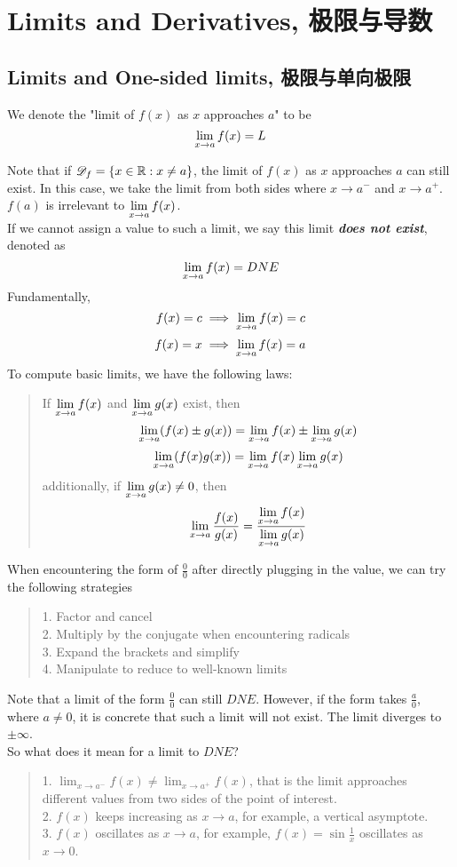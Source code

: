 \section{Limits and Derivatives, 极限与导数}
\subsection{Limits and One-sided limits, 极限与单向极限}
\begin{definition}
    We denote the "limit of $f(x)$ as $x$ approaches $a$" to be
    $$\lim_{x \to a} f(x) = L$$
\end{definition}
Note that if $\mathscr{D}_f = \{x \in \mathbb{R}: x \ne a\}$, the limit of $f(x)$ as $x$ approaches $a$ can still exist. In this case, we take the limit from both sides where $x \to a^-$ and $x \to a^+$. \\
$f(a)$ is irrelevant to $\displaystyle \lim_{x \to a} f(x)$. \\
If we cannot assign a value to such a limit, we say this limit \textbf{\textit{does not exist}}, denoted as
$$\lim_{x \to a} f(x) = DNE$$
Fundamentally, 
$$f(x) = c \implies \lim_{x \to a} f(x) = c$$
$$f(x) = x \implies \lim_{x \to a} f(x) = a$$
To compute basic limits, we have the following laws:
\begin{quote}
    If $\displaystyle \lim_{x \to a} f(x)$ and $\displaystyle \lim_{x \to a} g(x)$ exist, then
    $$\lim_{x \to a} (f(x) \pm g(x)) = \lim_{x \to a} f(x) \pm \lim_{x \to a} g(x)$$
    $$\lim_{x \to a} (f(x)g(x)) = \lim_{x \to a} f(x) \lim_{x \to a} g(x)$$
    additionally, if $\displaystyle \lim_{x \to a} g(x) \ne 0$, then 
    $$\lim_{x \to a} \frac{f(x)}{g(x)} = \frac{\displaystyle \lim_{x \to a} f(x)}{\displaystyle \lim_{x \to a} g(x)}$$
\end{quote}
When encountering the form of $\frac{0}{0}$ after directly plugging in the value, we can try the following strategies
\begin{quote}
    1. Factor and cancel \\
    2. Multiply by the conjugate when encountering radicals \\
    3. Expand the brackets and simplify \\
    4. Manipulate to reduce to well-known limits
\end{quote}
Note that a limit of the form $\frac{0}{0}$ can still $DNE$. However, if the form takes $\frac{a}{0}$, where $a \ne 0$, it is concrete that such a limit will not exist. The limit diverges to $\pm \infty$. \\
So what does it mean for a limit to $DNE$?
\begin{quote}
    1. $\displaystyle \lim_{x \to a^-} f(x) \ne \lim_{x \to a^+} f(x)$, that is the limit approaches different values from two sides of the point of interest. \\
    2. $f(x)$ keeps increasing as $x \to a$, for example, a vertical asymptote. \\
    3. $f(x)$ oscillates as $x \to a$, for example, $f(x) = \sin{\frac{1}{x}}$ oscillates as $x \to 0$.
\end{quote}
